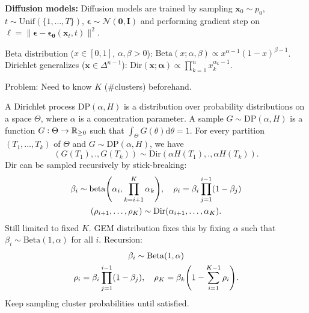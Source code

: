 \documentclass[9pt]{extarticle}
\newenvironment{topic}[1]
{\textbf{\sffamily \colorbox{black}{\rlap{\textbf{\textcolor{white}{#1}}}\hspace{\linewidth}\hspace{-2\fboxsep}}}}
{}
\newenvironment{subtopic}[1]
{\textbf{\sffamily #1:}}
{}
\renewcommand{\mat}[1]{\ensuremath{\mathbf{#1}}}
\renewcommand{\vec}[1]{\ensuremath{\mathbold{#1}}}
\begin{document}
\begin{multicols*}{3}
\begin{topic}{Stable diffusion}
\begin{subtopic}{Diffusion models}
            Diffusion models are trained by sampling $\vec{x}_0 \sim p_0$, $t \sim \mathrm{Unif}(\{ 1, \ldots,
                T \})$, $\vec{\epsilon} \sim \mathcal{N}(\vec{0}, \mat{I})$ and performing gradient step on $\ell =
                \| \vec{\epsilon} - \vec{\epsilon}_{\vec{\theta}}(\vec{x}_t, t) \|^2$.
        \end{subtopic}

    \end{topic}

    \begin{topic}{Non-parametric Bayesian methods}
        Beta distribution ($x \in [0,1]$, $\alpha,\beta > 0$): $\mathrm{Beta}(x; \alpha, \beta) \propto
            x^{\alpha-1} (1-x)^{\beta-1}$. Dirichlet generalizes ($\vec{x} \in \Delta^{n-1}$):
        $\mathrm{Dir}(\vec{x}; \vec{\alpha}) \propto \prod_{k=1}^n x_k^{\alpha_k - 1}$.

        Problem: Need to know $K$ (\#clusters) beforehand.

        A Dirichlet process $\mathrm{DP}(\alpha, H)$ is a distribution over probability distributions on a
        space $\Theta$, where $\alpha$ is a concentration parameter. A sample $G \sim \mathrm{DP}(\alpha,
            H)$ is a function $G: \Theta \to \mathbb{R}_{\geq 0}$ such that $\int_{\Theta} G(\theta)\mathrm{d}\theta =
            1$. For every partition $(T_1, \ldots, T_k)$ of $\Theta$ and $G \sim \mathrm{DP}(\alpha, H)$, we
        have \[
            (G(T_1), ., G(T_k)) \sim \mathrm{Dir}(\alpha H(T_1), ., \alpha H(T_k)).
        \]
        Dir can be sampled recursively by stick-breaking:
        \begin{gather*}
            \beta_i \sim \mathrm{beta}\lft( \alpha_i, \prod_{k=i+1}^K \alpha_k \rgt), \quad \rho_i = \beta_i \prod_{j=1}^{i-1} (1-\beta_j) \\
            (\rho_{i+1}, \ldots, \rho_K) \sim \mathrm{Dir}(\alpha_{i+1}, \ldots, \alpha_K).
        \end{gather*}
        Still limited to fixed $K$. GEM distribution fixes this by fixing $\alpha$ such that
        $\beta_i \sim \mathrm{Beta}(1, \alpha)$ for all $i$. Recursion:
        \begin{gather*}
            \beta_i \sim \mathrm{Beta}(1, \alpha)                     \\
            \rho_i = \beta_i \prod_{j=1}^{i-1} (1-\beta_j), \quad \rho_K = \beta_k \lft( 1- \sum_{i=1}^{K-1} \rho_i \rgt).
        \end{gather*}
        Keep sampling cluster probabilities until satisfied.


\end{topic}
\end{multicols*}
\end{document}
